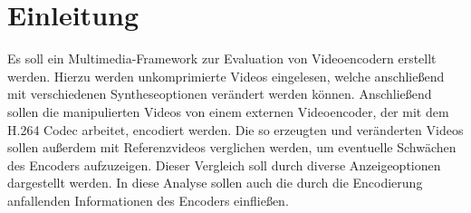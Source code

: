 \section{Einleitung}

Es soll ein Multimedia-Framework zur Evaluation von Videoencodern erstellt werden. Hierzu werden unkomprimierte Videos eingelesen, welche anschließend mit verschiedenen Syntheseoptionen verändert werden können. Anschließend sollen die manipulierten Videos von einem externen Videoencoder, der mit dem H.264 Codec arbeitet, encodiert werden. Die so erzeugten und veränderten Videos sollen außerdem mit Referenzvideos verglichen werden, um eventuelle Schwächen des Encoders aufzuzeigen. Dieser Vergleich soll durch diverse Anzeigeoptionen dargestellt werden. In diese Analyse sollen auch die durch die Encodierung anfallenden Informationen des Encoders einfließen.
